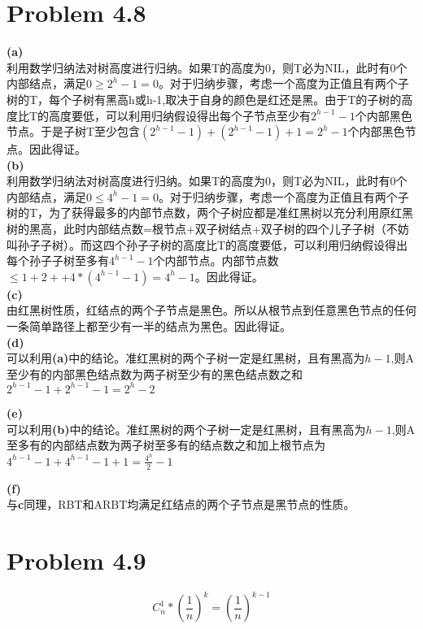 \documentclass[twocolumn]{ctexart}
\begin{document}
\section*{Problem 4.8}
\noindent \textbf{(a)}\\
\indent 利用数学归纳法对树高度进行归纳。如果T的高度为0，则T必为NIL，此时有0个内部结点，满足$0\geq2^h-1=0$。对于归纳步骤，考虑一个高度为正值且有两个子树的T，每个子树有黑高h或h-1,取决于自身的颜色是红还是黑。由于T的子树的高度比T的高度要低，可以利用归纳假设得出每个子节点至少有$2^{h-1}-1$个内部黑色节点。于是子树T至少包含$(2^{h-1}-1)+(2^{h-1}-1)+1=2^h-1$个内部黑色节点。因此得证。\\


\noindent \textbf{(b)}\\
\indent 利用数学归纳法对树高度进行归纳。如果T的高度为0，则T必为NIL，此时有0个内部结点，满足$0\leq4^h-1=0$。对于归纳步骤，考虑一个高度为正值且有两个子树的T，为了获得最多的内部节点数，两个子树应都是准红黑树以充分利用原红黑树的黑高，此时内部结点数=根节点+双子树结点+双子树的四个儿子子树（不妨叫孙子子树）。而这四个孙子子树的高度比T的高度要低，可以利用归纳假设得出每个孙子子树至多有$4^{h-1}-1$个内部节点。内部节点数$\leq1+2++4*(4^{h-1}-1)=4^h-1$。因此得证。\\




\noindent \textbf{(c)}\\
\indent 由红黑树性质，红结点的两个子节点是黑色。所以从根节点到任意黑色节点的任何一条简单路径上都至少有一半的结点为黑色。因此得证。\\

\noindent \textbf{(d)}\\
\indent 可以利用\textbf{(a)}中的结论。准红黑树的两个子树一定是红黑树，且有黑高为$h-1$,则A至少有的内部黑色结点数为两子树至少有的黑色结点数之和$2^{h-1}-1+2^{h-1}-1=2^h-2$

\noindent \textbf{(e)}\\
\indent 可以利用\textbf{(b)}中的结论。准红黑树的两个子树一定是红黑树，且有黑高为$h-1$,则A至多有的内部结点数为两子树至多有的结点数之和加上根节点为$4^{h-1}-1+4^{h-1}-1+1=\frac{4^h}{2}-1$

\noindent \textbf{(f)}\\
\indent 与\textbf{c}同理，RBT和ARBT均满足红结点的两个子节点是黑节点的性质。\\
\section*{Problem 4.9}
\[
C_n^1*(\frac{1}{n})^k=\left(\frac{1}{n}\right)^{k-1}
\]
\end{document}
